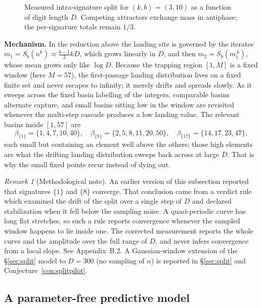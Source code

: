 \documentclass[11pt]{article}
\theoremstyle{definition}
\theoremstyle{remark}
\newtheorem{remark}[theorem]{Remark}
\begin{document}
\begin{figure}[htbp]
\centering

\caption{Measured intra-signature split for $(k,b)=(3,10)$ as a function of digit length $D$. Competing attractors exchange mass in antiphase; the per-signature totals remain $1/3$.}
\label{fig:split-osc}
\end{figure}

\textbf{Mechanism.} In the reduction above the landing site is governed by the iterates $m_1 = S_b(n^k) \approx \tfrac{b-1}{2} k D$, which grows linearly in $D$, and then $m_2 = S_b(m_1^{\,k})$, whose mean grows only like $\log D$. Because the trapping region $[1,M]$ is a fixed window (here $M = 57$), the first-passage landing distribution lives on a fixed finite set and never escapes to infinity; it merely drifts and spreads slowly. As it sweeps across the fixed basin labelling of the integers, comparable basins alternate capture, and small basins sitting low in the window are revisited whenever the multi-step cascade produces a low landing value. The relevant basins inside $[1,57]$ are
\[
\beta_{\{1\}} = \{1,4,7,10,40\}, \quad \beta_{\{8\}} = \{2,5,8,11,20,50\}, \quad \beta_{\{17\}} = \{14,17,23,47\},
\]
each small but containing an element well above the others; those high elements are what the drifting landing distribution sweeps back across at large $D$. That is why the small fixed points recur instead of dying out.

\begin{remark}[Methodological note]
An earlier version of this subsection reported that signatures $\{1\}$ and $\{8\}$ converge. That conclusion came from a verdict rule which examined the drift of the split over a single step of $D$ and declared stabilization when it fell below the sampling noise. A quasi-periodic curve has long flat stretches, so such a rule reports convergence whenever the sampled window happens to lie inside one. The corrected measurement reports the whole curve and the amplitude over the full range of $D$, and never infers convergence from a local slope. See Appendix~B.2. A Gaussian-window extension of the \S\ref{sec:split} model to $D=300$ (no sampling of $n$) is reported in \S\ref{sec:split} and Conjecture~\ref{con:splitpilot}.
\end{remark}

\subsection{A parameter-free predictive model}
\end{document}
